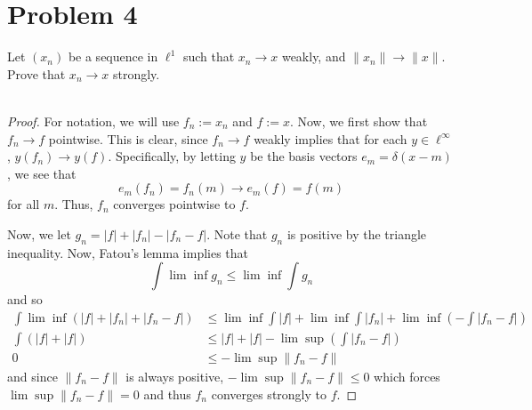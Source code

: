 \documentclass[fontsize=11pt]{scrartcl} %
\numberwithin{equation}{section} %
\numberwithin{figure}{section} %
\numberwithin{table}{section} %
\begin{document}
\section*{Problem 4}
Let $(x_n)$ be a sequence in $\ell^1$ such that $x_n\to x$ weakly, and
$\|x_n\|\to\|x\|$. Prove that $x_n\to x$ strongly.
\\
\\
\begin{proof}
    For notation, we will use $f_n := x_n$ and $f:=x$. Now, we first show that
    $f_n\to f$ pointwise. This is clear, since $f_n\to f$ weakly implies that
    for each $y\in\ell^{\infty}$, $y(f_n)\to y(f)$. Specifically, by letting $y$
    be the basis vectors $e_m = \delta(x-m)$, we see that
    \[
        e_m(f_n) = f_n(m) \to e_m(f) = f(m)
    \]
    for all $m$. Thus, $f_n$ converges pointwise to $f$.

    Now, we let $g_n = |f|+|f_n| - |f_n-f|$. Note that $g_n$ is positive by the
    triangle inequality. Now, Fatou's lemma implies that
    \[
        \int\lim\inf g_n \leq \lim\inf\int g_n
    \]
    and so
    \[
\begin{aligned}
    \int\lim\inf(|f|+|f_n|+|f_n-f|) &\leq \lim\inf\int|f| + \lim\inf\int|f_n| +
    \lim\inf(-\int|f_n-f|)\\
    \int(|f|+|f|) &\leq |f| + |f| - \lim\sup(\int|f_n-f|)\\
    0&\leq-\lim\sup\|f_n-f\|
\end{aligned}
    \]
    and since $\|f_n-f\|$ is always positive, $-\lim\sup\|f_n-f\|\leq 0$ which
    forces $\lim\sup\|f_n-f\| = 0$ and thus $f_n$ converges strongly to $f$.
\end{proof}
\end{document}

